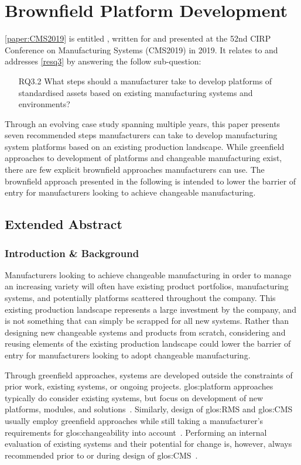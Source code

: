 \section{Brownfield Platform Development}\label{sec:brwnfld}
\cref{paper:CMS2019} is entitled , written for and presented at the 52nd CIRP Conference on Manufacturing Systems (CMS2019) in 2019.
It relates to and addresses \cref{resq3} by answering the follow sub-question:
\begin{enumerate}[leftmargin=3em]
  \item[RQ3.2] What steps should a manufacturer take to develop platforms of standardised assets based on existing manufacturing systems and environments?
\end{enumerate}
Through an evolving case study spanning multiple years, this paper presents seven recommended steps manufacturers can take to develop manufacturing system platforms based on an existing production landscape.
While greenfield approaches to development of platforms and changeable manufacturing exist, there are few explicit brownfield approaches manufacturers can use.
The brownfield approach presented in the following is intended to lower the barrier of entry for manufacturers looking to achieve changeable manufacturing.

\subsection{Extended Abstract}

\subsubsection*{Introduction \& Background}
Manufacturers looking to achieve changeable manufacturing in order to manage an increasing variety will often have existing product portfolios, manufacturing systems, and potentially platforms scattered throughout the company. 
This existing production landscape represents a large investment by the company, and is not something that can simply be scrapped for all new systems.
Rather than designing new changeable systems and products from scratch, considering and reusing elements of the existing production landscape could lower the barrier of entry for manufacturers looking to adopt changeable manufacturing.

Through greenfield approaches, systems are developed outside the constraints of prior work, existing systems, or ongoing projects.
\Gls{glos:platform} approaches typically do consider existing systems, but focus on development of new platforms, modules, and solutions~\parencite{JoergensenPaper,SorensenMCPC2017}.
Similarly, design of \gls{glos:RMS} and \gls{glos:CMS} usually employ greenfield approaches while still taking a manufacturer's requirements for \gls{glos:changeability} into account~\parencite{Andersen2017179,doi:10.1080/00207543.2017.1394594}.
Performing an internal evaluation of existing systems and their potential for change is, however, always recommended prior to or during design of \gls{glos:CMS}~\parencite{ElMaraghy2005}.

